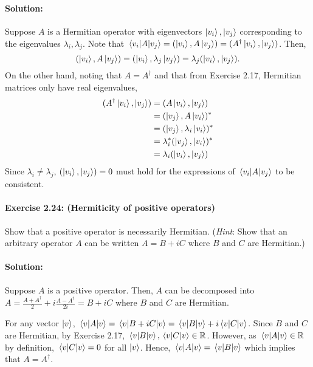 \documentclass{article}
\begin{document}
\paragraph{Solution:} Suppose $A$ is a Hermitian operator with eigenvectors
$\ket{v_i}, \ket{v_j}$ corresponding to the eigenvalues $\lambda_i, \lambda_j$.
Note that $\mel{v_i}{A}{v_j} = (\ket{v_i}, A\ket{v_j}) = (A^\dagger \ket{v_i},
\ket{v_j})$. Then, \begin{equation*}
  (\ket{v_i}, A\ket{v_j}) = (\ket{v_i}, \lambda_j\ket{v_j}) = \lambda_j
    (\ket{v_i}, \ket{v_j}).
\end{equation*}
On the other hand, noting that $A = A^\dagger$ and that from Exercise 2.17,
Hermitian matrices only have real eigenvalues, \begin{align*}
  (A^\dagger \ket{v_i}, \ket{v_j}) &= (A\ket{v_i}, \ket{v_j}) \\
    &= (\ket{v_j}, A\ket{v_i})^* \\
    &= (\ket{v_j}, \lambda_i\ket{v_i})^* \\
    &= \lambda_i^*(\ket{v_j}, \ket{v_i})^* \\
    &= \lambda_i(\ket{v_i}, \ket{v_j})
\end{align*}
Since $\lambda_i \neq \lambda_j$, $(\ket{v_i}, \ket{v_j}) = 0$ must hold for
the expressions of $\mel{v_i}{A}{v_j}$ to be consistent.

\paragraph{\cite{mikeandike} Exercise 2.24: (Hermiticity of positive
operators)} Show that a positive operator is necessarily Hermitian.
(\emph{Hint}: Show that an arbitrary operator $A$ can be written $A = B + iC$
where $B$ and $C$ are Hermitian.)

\paragraph{Solution:} Suppose $A$ is a positive operator. Then, $A$ can be
decomposed into $A = \frac{A + A^\dagger}{2} + i\frac{A - A^\dagger}{2i} = B +
iC$ where $B$ and $C$ are Hermitian.

For any vector $\ket{v}$, $\mel{v}{A}{v} = \mel{v}{B + iC}{v} = \mel{v}{B}{v} +
i\mel{v}{C}{v}$. Since $B$ and $C$ are Hermitian, by Exercise 2.17,
$\mel{v}{B}{v}, \mel{v}{C}{v} \in \mathbb{R}$. However, as $\mel{v}{A}{v} \in
\mathbb{R}$ by definition, $\mel{v}{C}{v} = 0$ for all $\ket{v}$. Hence,
$\mel{v}{A}{v} = \mel{v}{B}{v}$ which implies that $A = A^\dagger$.
\end{document}
